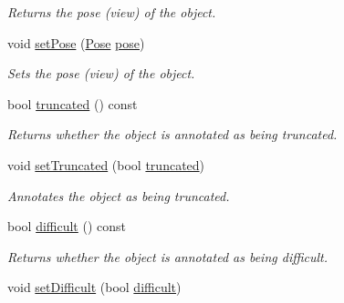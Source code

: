\begin{DoxyCompactItemize}
\begin{DoxyCompactList}\small\item\em Returns the pose (view) of the object. \end{DoxyCompactList}\item 
\hypertarget{class_f_f_l_d_1_1_object_a8bdb30bfb3d86ce087705914a6f08ca1}{void \hyperlink{class_f_f_l_d_1_1_object_a8bdb30bfb3d86ce087705914a6f08ca1}{set\-Pose} (\hyperlink{class_f_f_l_d_1_1_object_a922b08e7fb8e69b9092b01eee82cd7ec}{Pose} \hyperlink{class_f_f_l_d_1_1_object_a370d8f00e19a2fedbf29c0f99804f1a1}{pose})}\label{class_f_f_l_d_1_1_object_a8bdb30bfb3d86ce087705914a6f08ca1}

\begin{DoxyCompactList}\small\item\em Sets the pose (view) of the object. \end{DoxyCompactList}\item 
\hypertarget{class_f_f_l_d_1_1_object_aeb5fb9d9d6b975438b441d31230261e3}{bool \hyperlink{class_f_f_l_d_1_1_object_aeb5fb9d9d6b975438b441d31230261e3}{truncated} () const }\label{class_f_f_l_d_1_1_object_aeb5fb9d9d6b975438b441d31230261e3}

\begin{DoxyCompactList}\small\item\em Returns whether the object is annotated as being truncated. \end{DoxyCompactList}\item 
\hypertarget{class_f_f_l_d_1_1_object_ad2edf2a24c537ce7731e9425a049d224}{void \hyperlink{class_f_f_l_d_1_1_object_ad2edf2a24c537ce7731e9425a049d224}{set\-Truncated} (bool \hyperlink{class_f_f_l_d_1_1_object_aeb5fb9d9d6b975438b441d31230261e3}{truncated})}\label{class_f_f_l_d_1_1_object_ad2edf2a24c537ce7731e9425a049d224}

\begin{DoxyCompactList}\small\item\em Annotates the object as being truncated. \end{DoxyCompactList}\item 
\hypertarget{class_f_f_l_d_1_1_object_a7316217057e6c76b57cd37b570d8c24f}{bool \hyperlink{class_f_f_l_d_1_1_object_a7316217057e6c76b57cd37b570d8c24f}{difficult} () const }\label{class_f_f_l_d_1_1_object_a7316217057e6c76b57cd37b570d8c24f}

\begin{DoxyCompactList}\small\item\em Returns whether the object is annotated as being difficult. \end{DoxyCompactList}\item 
\hypertarget{class_f_f_l_d_1_1_object_a9d090f14838946494fad4e12480396c0}{void \hyperlink{class_f_f_l_d_1_1_object_a9d090f14838946494fad4e12480396c0}{set\-Difficult} (bool \hyperlink{class_f_f_l_d_1_1_object_a7316217057e6c76b57cd37b570d8c24f}{difficult})}\label{class_f_f_l_d_1_1_object_a9d090f14838946494fad4e12480396c0}


\end{DoxyCompactItemize}
